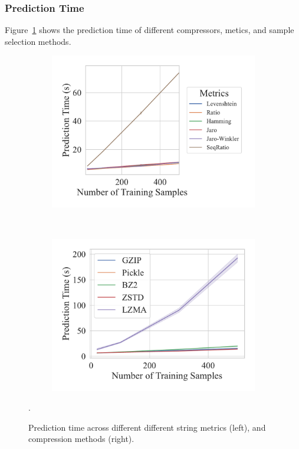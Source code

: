 \subsubsection{Prediction Time}

Figure~\ref{fig:truthseeker_prediction_time} shows the prediction time of different compressors, metics, and sample selection methods.
\begin{figure}[h!]
	\centering
    \captionsetup[subfigure]{skip=0pt}
	\begin{subfigure}[t]{.44\textwidth}
		\centering
		\includegraphics[width=\textwidth]{figs/truthseeker/string_metric_vs_predict_time.pdf}
	\end{subfigure}
	~
	\begin{subfigure}[t]{.44\textwidth}
		\centering
		\includegraphics[width=\textwidth]{figs/truthseeker/compressor_metric_vs_predict_time.pdf}
	\end{subfigure}
	\caption{Prediction time across different different string metrics (left), and compression methods (right).}.
	\label{fig:truthseeker_prediction_time}
 
\end{figure}

